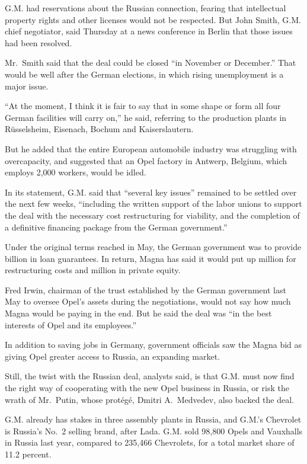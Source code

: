 ﻿\documentclass[12pt]{article}
\begin{document}
G.M. had reservations about the Russian connection, fearing that intellectual property rights and
other licenses would not be respected. But John Smith, G.M. chief negotiator, said Thursday at a
news conference in Berlin that those issues had been resolved.

Mr.~Smith said that the deal could be closed ``in November or December.'' That would be well after
the German elections, in which rising unemployment is a major issue.

``At the moment, I think it is fair to say that in some shape or form all four German facilities
will carry on,'' he said, referring to the production plants in Rüsselsheim, Eisenach, Bochum and
Kaiserslautern.

But he added that the entire European automobile industry was struggling with overcapacity, and
suggested that an Opel factory in Antwerp, Belgium, which employs 2,000 workers, would be idled.

In its statement, G.M. said that ``several key issues'' remained to be settled over the next few
weeks, ``including the written support of the labor unions to support the deal with the necessary
cost restructuring for viability, and the completion of a definitive financing package from the
German government.''

Under the original terms reached in May, the German government was to provide  billion
in loan guarantees. In return, Magna has said it would put up  million for restructuring
costs and  million in private equity.

Fred Irwin, chairman of the trust established by the German government last May to oversee Opel's
assets during the negotiations, would not say how much Magna would be paying in the end. But he said
the deal was ``in the best interests of Opel and its employees.''

In addition to saving jobs in Germany, government officials saw the Magna bid as giving Opel greater
access to Russia, an expanding market.

Still, the twist with the Russian deal, analysts said, is that G.M. must now find the right way of
cooperating with the new Opel business in Russia, or risk the wrath of Mr.~Putin, whose prot\'eg\'e,
Dmitri A.~Medvedev, also backed the deal.

G.M. already has stakes in three assembly plants in Russia, and G.M.'s Chevrolet is Russia's No.~2
selling brand, after Lada. G.M. sold 98,800 Opels and Vauxhalls in Russia last year, compared to
235,466 Chevrolets, for a total market share of 11.2 percent.
\end{document}
